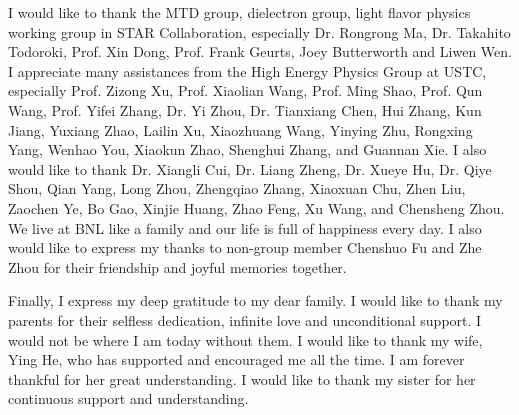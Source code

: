 \begin{thanks}
I would like to thank the MTD group, dielectron group, light flavor physics working group in STAR Collaboration, especially Dr. Rongrong Ma, Dr. Takahito Todoroki, Prof. Xin Dong, Prof. Frank Geurts, Joey Butterworth and Liwen Wen. I appreciate many assistances from the High Energy Physics Group at USTC, especially Prof. Zizong Xu, Prof. Xiaolian Wang, Prof. Ming Shao, Prof. Qun Wang, Prof. Yifei Zhang, Dr. Yi Zhou, Dr. Tianxiang Chen, Hui Zhang, Kun Jiang, Yuxiang Zhao, Lailin Xu, Xiaozhuang Wang, Yinying Zhu, Rongxing Yang, Wenhao You, Xiaokun Zhao, Shenghui Zhang, and Guannan Xie. I also would like to thank Dr. Xiangli Cui, Dr. Liang Zheng, Dr. Xueye Hu, Dr. Qiye Shou, Qian Yang, Long Zhou, Zhengqiao Zhang, Xiaoxuan Chu, Zhen Liu, Zaochen Ye, Bo Gao, Xinjie Huang, Zhao Feng, Xu Wang, and Chensheng Zhou. We live at BNL like a family and our life is full of happiness every day. I also would like to express my thanks to non-group member Chenshuo Fu and Zhe Zhou for their friendship and joyful memories together.

Finally, I express my deep gratitude to my dear family. I would like to thank my parents for their selfless dedication, infinite love and unconditional support.  I would not be where I am today without them. I would like to thank my wife, Ying He, who has supported and encouraged me all the time. I am forever thankful for her great understanding. I would like to thank my sister for her continuous support and understanding.
\end{thanks}
